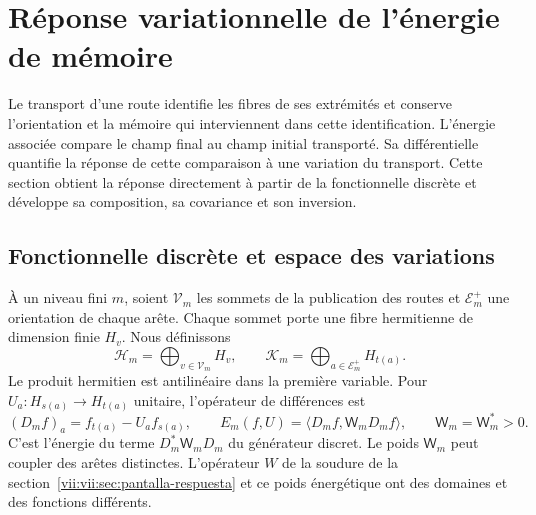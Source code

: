 
\section{Réponse variationnelle de l'énergie de mémoire}
\label{vii:vii:sec:variacion-memoria}

Le transport d'une route identifie les fibres de ses extrémités et conserve l'orientation et la mémoire qui interviennent dans cette identification. L'énergie associée compare le champ final au champ initial transporté. Sa différentielle quantifie la réponse de cette comparaison à une variation du transport. Cette section obtient la réponse directement à partir de la fonctionnelle discrète et développe sa composition, sa covariance et son inversion.

\subsection{Fonctionnelle discrète et espace des variations}
\label{vii:vii:subsec:funcional-memoria}

À un niveau fini \(m\), soient \(\mathcal V_m\) les sommets de la
publication des routes et \(\mathcal E_m^+\) une orientation de chaque arête.
Chaque sommet porte une fibre hermitienne de dimension finie \(H_v\).
Nous définissons
\[
 \mathcal H_m=\bigoplus_{v\in\mathcal V_m}H_v,\qquad
 \mathcal K_m=\bigoplus_{a\in\mathcal E_m^+}H_{t(a)}.
\]
Le produit hermitien est antilinéaire dans la première variable.
Pour \(U_a:H_{s(a)}\to H_{t(a)}\) unitaire, l'opérateur de différences est
\begin{equation}
 (D_mf)_a=f_{t(a)}-U_af_{s(a)},\qquad
 E_m(f,U)=\langle D_mf,\mathsf W_mD_mf\rangle,\qquad
 \mathsf W_m=\mathsf W_m^*>0.
 \label{vii:vii:eq:energia-memoria-discreta}
\end{equation}
C'est l'énergie du terme \(D_m^*\mathsf W_mD_m\) du générateur discret.
Le poids \(\mathsf W_m\) peut coupler des arêtes distinctes. L'opérateur \(W\)
de la soudure de la section~\ref{vii:vii:sec:pantalla-respuesta} et ce poids
énergétique ont des domaines et des fonctions différents.

